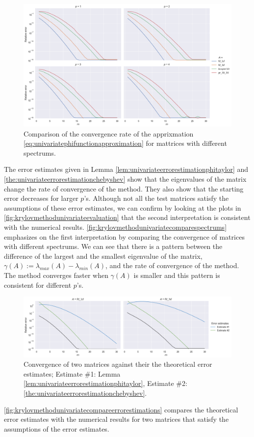 \begin{figure}[h!]
    \centering
    \includegraphics[width=.9\textwidth]{img/krylovunivariate/compare_spectrums.png}
    \caption{Comparison of the convergence rate of the apprixmation \eqref{eq:univariatephifunctionapproximation} for mattrices with different spectrums.}
    \label{fig:krylovmethodunivariatecomparespectrums}
\end{figure}

The error estimates given in Lemma \ref{lem:univariateerrorestimationphitaylor} and \autoref{the:univariateerrorestimationchebyshev}
show that the eigenvalues of the matrix change the rate of convergence of the method. They also show that the starting error
decreases for larger $p$'s. Although not all the test matrices satisfy the assumptions of these error estimates, we can confirm
by looking at the plots in \autoref{fig:krylovmethodunivariateevaluation} that the second interpretation is consistent with
the numerical results. \autoref{fig:krylovmethodunivariatecomparespectrums} emphasizes on the first interpretation by comparing
the convergence of matrices with different spectrums. We can see that there is a pattern between the difference of the largest
and the smallest eigenvalue of the matrix, $\gamma(A) := \lambda_{max}(A) - \lambda_{min}(A)$, and the rate of convergence of
the method. The method converges faster when $\gamma(A)$ is smaller and this pattern is consistent for different $p$'s.

\begin{figure}[h!]
    \centering
    \includegraphics[width=.9\textwidth]{img/krylovunivariate/compare_errorbounds.png}
    \caption{
        Convergence of two matrices against their the theoretical error estimates;
        Estimate \#1: Lemma \ref{lem:univariateerrorestimationphitaylor},
        Estimate \#2: \autoref{the:univariateerrorestimationchebyshev}.
        }
    \label{fig:krylovmethodunivariatecompareerrorestimations}
\end{figure}


\autoref{fig:krylovmethodunivariatecompareerrorestimations} compares the theoretical error estimates with the numerical
results for two matrices that satisfy the assumptions of the error estimates.
